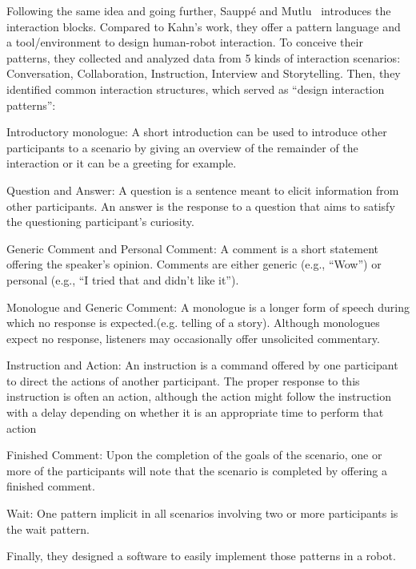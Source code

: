 \documentclass[a4paper,11pt,twoside]{StyleThese}
\begin{document}
Following the same idea and going further, Sauppé and Mutlu~\cite{sauppe_2014_design} introduces the interaction blocks. Compared to Kahn’s work, they offer a pattern language and a tool/environment to design human-robot interaction. To conceive their patterns, they collected and analyzed data from 5 kinds of interaction scenarios: Conversation, Collaboration, Instruction, Interview and Storytelling.
Then, they identified common interaction structures, which served as ``design interaction patterns'':
\begin{enumerate*}
	\item Introductory monologue: A short introduction can be used to introduce other participants to a scenario by giving an overview of the remainder of the interaction or it can be a greeting for example.
	\item Question and Answer: A question is a sentence meant to elicit information from other participants. An answer is the response to a question that aims to satisfy the questioning participant’s curiosity.
	\item Generic Comment and Personal Comment: A comment is a short statement offering the speaker’s opinion. Comments are either generic (e.g., ``Wow'') or personal (e.g., ``I tried that and didn’t like it'').
	\item Monologue and Generic Comment: A monologue is a longer form of speech during which no response is expected.(e.g. telling of a story). Although monologues expect no response, listeners may occasionally offer unsolicited commentary.
	\item Instruction and Action: An instruction is a command offered by one participant to direct the actions of another participant. The proper response to this instruction is often an action, although the action might follow the instruction with a delay depending on whether it is an appropriate time to perform that action
	\item Finished Comment: Upon the completion of the goals of the scenario, one or more of the participants will note that the scenario is completed by offering a finished comment.
	\item Wait: One pattern implicit in all scenarios involving two or more participants is the wait pattern.
\end{enumerate*}
Finally, they designed a software to easily implement those patterns in a robot.
\end{document}
